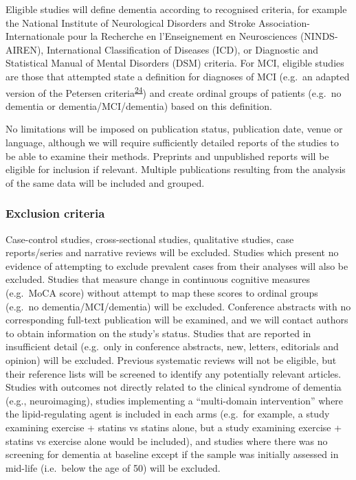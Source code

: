 \documentclass[a4paper, twoside]{templates/ociamthesis}
\begin{document}
Eligible studies will define dementia according to recognised criteria, for example the National Institute of Neurological Disorders and Stroke Association-Internationale pour la Recherche en l'Enseignement en Neurosciences (NINDS-AIREN), International Classification of Diseases (ICD), or Diagnostic and Statistical Manual of Mental Disorders (DSM) criteria. For MCI, eligible studies are those that attempted state a definition for diagnoses of MCI (e.g.~an adapted version of the Petersen criteria\textsuperscript{\protect\hyperlink{ref-petersen1999}{24}}) and create ordinal groups of patients (e.g.~no dementia or dementia/MCI/dementia) based on this definition.

No limitations will be imposed on publication status, publication date, venue or language, although we will require sufficiently detailed reports of the studies to be able to examine their methods. Preprints and unpublished reports will be eligible for inclusion if relevant. Multiple publications resulting from the analysis of the same data will be included and grouped.

\hypertarget{exclusion-criteria}{%
\subsubsection{Exclusion criteria}\label{exclusion-criteria}}

Case-control studies, cross-sectional studies, qualitative studies, case reports/series and narrative reviews will be excluded. Studies which present no evidence of attempting to exclude prevalent cases from their analyses will also be excluded. Studies that measure change in continuous cognitive measures (e.g.~MoCA score) without attempt to map these scores to ordinal groups (e.g.~no dementia/MCI/dementia) will be excluded. Conference abstracts with no corresponding full-text publication will be examined, and we will contact authors to obtain information on the study's status. Studies that are reported in insufficient detail (e.g.~only in conference abstracts, new, letters, editorials and opinion) will be excluded. Previous systematic reviews will not be eligible, but their reference lists will be screened to identify any potentially relevant articles. Studies with outcomes not directly related to the clinical syndrome of dementia (e.g., neuroimaging), studies implementing a ``multi-domain intervention'' where the lipid-regulating agent is included in each arms (e.g.~for example, a study examining exercise + statins vs statins alone, but a study examining exercise + statins vs exercise alone would be included), and studies where there was no screening for dementia at baseline except if the sample was initially assessed in mid-life (i.e.~below the age of 50) will be excluded.
\end{document}
